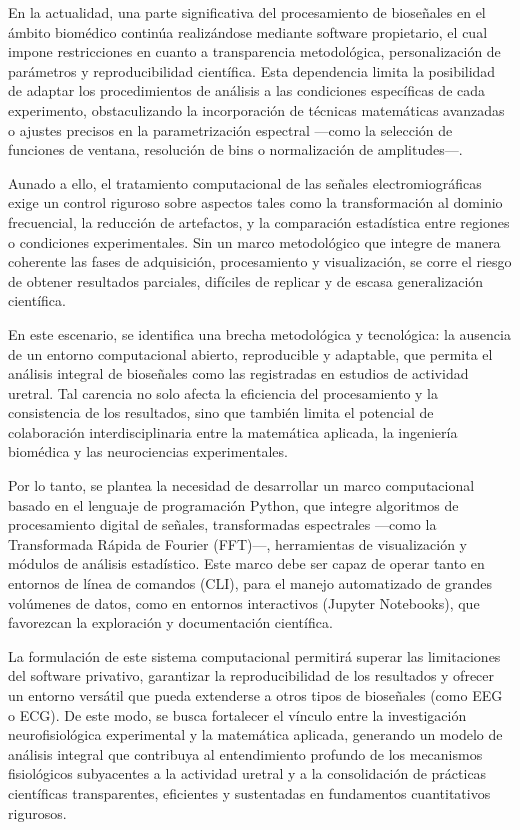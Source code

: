 \parskip=15pt
\noindent En la actualidad, una parte significativa del procesamiento de bioseñales en el ámbito biomédico continúa realizándose mediante software propietario, el cual impone restricciones en cuanto a transparencia metodológica, personalización de parámetros y reproducibilidad científica. Esta dependencia limita la posibilidad de adaptar los procedimientos de análisis a las condiciones específicas de cada experimento, obstaculizando la incorporación de técnicas matemáticas avanzadas o ajustes precisos en la parametrización espectral —como la selección de funciones de ventana, resolución de bins o normalización de amplitudes—.

\noindent Aunado a ello, el tratamiento computacional de las señales electromiográficas exige un control riguroso sobre aspectos tales como la transformación al dominio frecuencial, la reducción de artefactos, y la comparación estadística entre regiones o condiciones experimentales. Sin un marco metodológico que integre de manera coherente las fases de adquisición, procesamiento y visualización, se corre el riesgo de obtener resultados parciales, difíciles de replicar y de escasa generalización científica.

\noindent En este escenario, se identifica una brecha metodológica y tecnológica: la ausencia de un entorno computacional abierto, reproducible y adaptable, que permita el análisis integral de bioseñales como las registradas en estudios de actividad uretral. Tal carencia no solo afecta la eficiencia del procesamiento y la consistencia de los resultados, sino que también limita el potencial de colaboración interdisciplinaria entre la matemática aplicada, la ingeniería biomédica y las neurociencias experimentales.

\noindent Por lo tanto, se plantea la necesidad de desarrollar un marco computacional basado en el lenguaje de programación Python, que integre algoritmos de procesamiento digital de señales, transformadas espectrales —como la Transformada Rápida de Fourier (FFT)—, herramientas de visualización y módulos de análisis estadístico. Este marco debe ser capaz de operar tanto en entornos de línea de comandos (CLI), para el manejo automatizado de grandes volúmenes de datos, como en entornos interactivos (Jupyter Notebooks), que favorezcan la exploración y documentación científica.

\noindent La formulación de este sistema computacional permitirá superar las limitaciones del software privativo, garantizar la reproducibilidad de los resultados y ofrecer un entorno versátil que pueda extenderse a otros tipos de bioseñales (como EEG o ECG). De este modo, se busca fortalecer el vínculo entre la investigación neurofisiológica experimental y la matemática aplicada, generando un modelo de análisis integral que contribuya al entendimiento profundo de los mecanismos fisiológicos subyacentes a la actividad uretral y a la consolidación de prácticas científicas transparentes, eficientes y sustentadas en fundamentos cuantitativos rigurosos.

